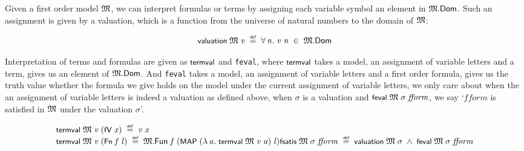 \documentclass[letterpaper]{article}
\renewcommand{\HOLConst}[1]{{\textsf{\upshape\small #1}}}
\renewcommand{\HOLinline}[1]{\ensuremath{#1}}
\newenvironment{holmath}{\begin{displaymath}\begin{array}{l}}{\end{array}\end{displaymath}\ignorespacesafterend}
\begin{document}
Given a first order model \HOLinline{\HOLFreeVar{\ensuremath{\mathfrak{M}}}}, we can interpret formulas or terms by assigning each variable symbol an element in \HOLinline{\HOLFreeVar{\ensuremath{\mathfrak{M}}}.\HOLFieldName{Dom}}. Such an assignment is given by a valuation, which is a function from the universe of natural numbers to the domain of \HOLinline{\HOLFreeVar{\ensuremath{\mathfrak{M}}}}:

\begin{holmath}
  \HOLConst{valuation}\;\HOLFreeVar{\ensuremath{\mathfrak{M}}}\;\HOLFreeVar{v}\;\HOLSymConst{\HOLTokenDefEquality{}}\;\HOLSymConst{\HOLTokenForall{}}\HOLBoundVar{n}.\;\HOLFreeVar{v}\;\HOLBoundVar{n}\;\HOLSymConst{\HOLTokenIn{}}\;\HOLFreeVar{\ensuremath{\mathfrak{M}}}.\HOLFieldName{Dom}
\end{holmath} 

Interpretation of terms and formulas are given as \HOLinline{\HOLConst{termval}} and \texttt{feval}, where \HOLinline{\HOLConst{termval}} takes a model, an assignment of variable letters and a term, gives us an element of \HOLinline{\HOLFreeVar{\ensuremath{\mathfrak{M}}}.\HOLFieldName{Dom}}. And \texttt{feval} takes a model, an assignment of variable letters and a first order formula, gives us the truth value whether the formula we give holds on the model under the current assignment of variable letters, we only care about when the an assignment of variable letters is indeed a valuation as defined above, when $\sigma$ is a valuation and \HOLinline{\HOLConst{feval}\;\HOLFreeVar{\ensuremath{\mathfrak{M}}}\;\HOLFreeVar{\ensuremath{\sigma}}\;\HOLFreeVar{fform}}, we say `$fform$ is satisfied in \HOLinline{\HOLFreeVar{\ensuremath{\mathfrak{M}}}} under the valuation $\sigma$'.

\begin{holmath}
  \HOLConst{termval}\;\HOLFreeVar{\ensuremath{\mathfrak{M}}}\;\HOLFreeVar{v}\;(\HOLConst{fV}\;\HOLFreeVar{x})\;\HOLSymConst{\HOLTokenDefEquality{}}\;\HOLFreeVar{v}\;\HOLFreeVar{x}\\
\HOLConst{termval}\;\HOLFreeVar{\ensuremath{\mathfrak{M}}}\;\HOLFreeVar{v}\;(\HOLConst{Fn}\;\HOLFreeVar{f}\;\HOLFreeVar{l})\;\HOLSymConst{\HOLTokenDefEquality{}}\;\HOLFreeVar{\ensuremath{\mathfrak{M}}}.\HOLFieldName{Fun}\;\HOLFreeVar{f}\;(\HOLConst{MAP}\;(\HOLTokenLambda{}\HOLBoundVar{a}.\;\HOLConst{termval}\;\HOLFreeVar{\ensuremath{\mathfrak{M}}}\;\HOLFreeVar{v}\;\HOLBoundVar{a})\;\HOLFreeVar{l})
  \HOLConst{fsatis}\;\HOLFreeVar{\ensuremath{\mathfrak{M}}}\;\HOLFreeVar{\ensuremath{\sigma}}\;\HOLFreeVar{fform}\;\HOLSymConst{\HOLTokenDefEquality{}}\;\HOLConst{valuation}\;\HOLFreeVar{\ensuremath{\mathfrak{M}}}\;\HOLFreeVar{\ensuremath{\sigma}}\;\HOLSymConst{\HOLTokenConj{}}\;\HOLConst{feval}\;\HOLFreeVar{\ensuremath{\mathfrak{M}}}\;\HOLFreeVar{\ensuremath{\sigma}}\;\HOLFreeVar{fform}
\end{holmath}
\end{document}
